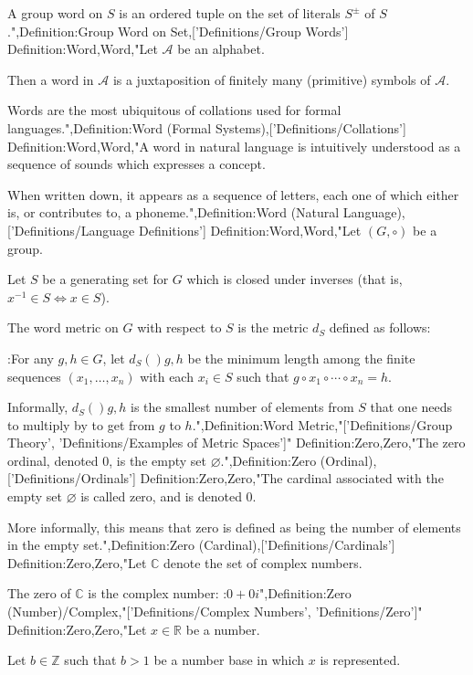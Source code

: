 A group word on $S$ is an ordered tuple on the set of literals $S^\pm$ of $S$.",Definition:Group Word on Set,['Definitions/Group Words']
Definition:Word,Word,"Let $\mathcal A$ be an alphabet.


Then a word in $\mathcal A$ is a juxtaposition of finitely many (primitive) symbols of $\mathcal A$.

Words are the most ubiquitous of collations used for formal languages.",Definition:Word (Formal Systems),['Definitions/Collations']
Definition:Word,Word,"A word in natural language is intuitively understood as a sequence of sounds which expresses a concept.

When written down, it appears as a sequence of letters, each one of which either is, or contributes to, a phoneme.",Definition:Word (Natural Language),['Definitions/Language Definitions']
Definition:Word,Word,"Let $\left( G, \circ \right)$ be a group.

Let $S$ be a generating set for $G$ which is closed under inverses (that is, $x^{-1} \in S \iff x \in S$).


The word metric on $G$ with respect to $S$ is the metric $d_S$ defined as follows:

:For any $g, h \in G$, let $d_S \left(   \right){g, h}$ be the minimum length among the finite sequences $\left( x_1, \dots, x_n \right)$ with each $x_i \in S$ such that $g \circ x_1 \circ \cdots \circ x_n = h$.


Informally, $d_S \left(   \right){g, h}$ is the smallest number of elements from $S$ that one needs to multiply by to get from $g$ to $h$.",Definition:Word Metric,"['Definitions/Group Theory', 'Definitions/Examples of Metric Spaces']"
Definition:Zero,Zero,"The zero ordinal, denoted $0$, is the empty set $\varnothing$.",Definition:Zero (Ordinal),['Definitions/Ordinals']
Definition:Zero,Zero,"The cardinal associated with the empty set $\varnothing$ is called zero, and is denoted $0$.


More informally, this means that zero is defined as being the number of elements in the empty set.",Definition:Zero (Cardinal),['Definitions/Cardinals']
Definition:Zero,Zero,"Let $\mathbb C$ denote the set of complex numbers.

The zero of $\mathbb C$ is the complex number:
:$0 + 0 i$",Definition:Zero (Number)/Complex,"['Definitions/Complex Numbers', 'Definitions/Zero']"
Definition:Zero,Zero,"Let $x \in \mathbb R$ be a number.

Let $b \in \mathbb Z$ such that $b > 1$ be a number base in which $x$ is represented.

